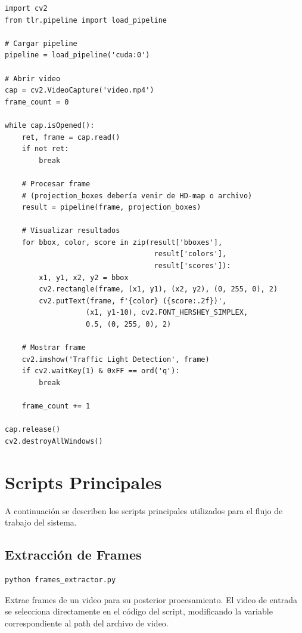 \begin{codesnippet}
\begin{verbatim}
import cv2
from tlr.pipeline import load_pipeline

# Cargar pipeline
pipeline = load_pipeline('cuda:0')

# Abrir video
cap = cv2.VideoCapture('video.mp4')
frame_count = 0

while cap.isOpened():
    ret, frame = cap.read()
    if not ret:
        break

    # Procesar frame
    # (projection_boxes debería venir de HD-map o archivo)
    result = pipeline(frame, projection_boxes)

    # Visualizar resultados
    for bbox, color, score in zip(result['bboxes'],
                                   result['colors'],
                                   result['scores']):
        x1, y1, x2, y2 = bbox
        cv2.rectangle(frame, (x1, y1), (x2, y2), (0, 255, 0), 2)
        cv2.putText(frame, f'{color} ({score:.2f})',
                   (x1, y1-10), cv2.FONT_HERSHEY_SIMPLEX,
                   0.5, (0, 255, 0), 2)

    # Mostrar frame
    cv2.imshow('Traffic Light Detection', frame)
    if cv2.waitKey(1) & 0xFF == ord('q'):
        break

    frame_count += 1

cap.release()
cv2.destroyAllWindows()
\end{verbatim}
\end{codesnippet}

\section{Scripts Principales}

A continuación se describen los scripts principales utilizados para el flujo de trabajo del sistema.

\subsection{Extracción de Frames}

\begin{codesnippet}
\begin{verbatim}
python frames_extractor.py
\end{verbatim}
\end{codesnippet}

Extrae frames de un video para su posterior procesamiento. El video de entrada se selecciona directamente en el código del script, modificando la variable correspondiente al path del archivo de video.

